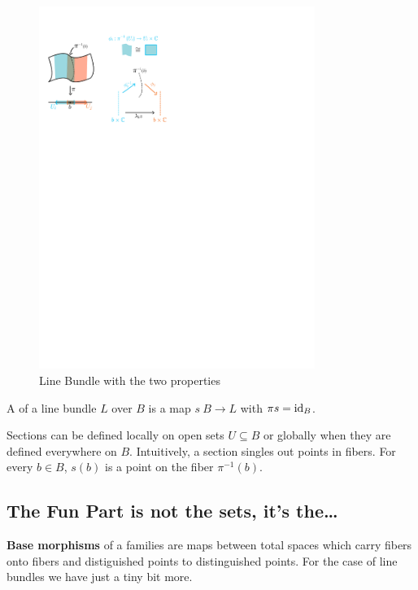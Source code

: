 \documentclass[12pt]{memoir}
\begin{document}
\begin{figure}[h!]
    \centering
    \includegraphics[width=0.8\textwidth, trim= 0.725cm 19.25cm 11.625cm 2.25cm,clip]{figs/figLineBundleDefn.pdf}
    \caption{Line Bundle with the two properties}
    \label{fig:2.1-LineBdlExample}
\end{figure} 

\begin{Def}
    A  of a line bundle $L$ over $B$ is a map $s\:B\to L$ with $\pi s=\operatorname{id}_B$. 
\end{Def}

Sections can be defined locally on open sets $U\subseteq B$ or globally when they are defined everywhere on $B$. Intuitively, a section singles out points in fibers. For every $b\in B$, $s(b)$ is a point on the fiber $\pi^{-1}(b)$.
\subsection*{The Fun Part is not the sets, it's the\dots}

\textbf{Base morphisms} of a families are maps between total spaces which carry fibers onto fibers and distiguished points to distinguished points. For the case of line bundles we have just a tiny bit more.
    
\end{document}
